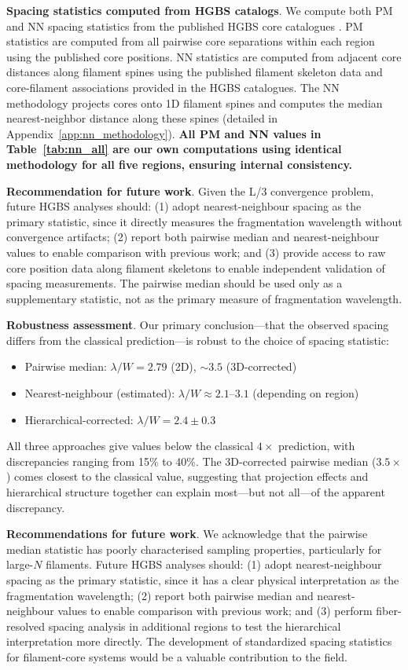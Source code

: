 \documentclass[twoside,twocolumn]{mnras}
\begin{document}
\textbf{Spacing statistics computed from HGBS catalogs}. We compute both PM and NN spacing statistics from the published HGBS core catalogues \citep{Konyves2015, Konyves2020, Andre2016, Ladjelate2020}. PM statistics are computed from all pairwise core separations within each region using the published core positions. NN statistics are computed from adjacent core distances along filament spines using the published filament skeleton data and core-filament associations provided in the HGBS catalogues. The NN methodology projects cores onto 1D filament spines and computes the median nearest-neighbor distance along these spines (detailed in Appendix~\ref{app:nn_methodology}). \textbf{All PM and NN values in Table~\ref{tab:nn_all} are our own computations using identical methodology for all five regions, ensuring internal consistency.}

\textbf{Recommendation for future work}. Given the L/3 convergence problem, future HGBS analyses should: (1) adopt nearest-neighbour spacing as the primary statistic, since it directly measures the fragmentation wavelength without convergence artifacts; (2) report both pairwise median and nearest-neighbour values to enable comparison with previous work; and (3) provide access to raw core position data along filament skeletons to enable independent validation of spacing measurements. The pairwise median should be used only as a supplementary statistic, not as the primary measure of fragmentation wavelength.

\textbf{Robustness assessment}. Our primary conclusion—that the observed spacing differs from the classical prediction—is robust to the choice of spacing statistic:
\begin{itemize}
    \item Pairwise median: $\lambda/W = 2.79$ (2D), $\sim 3.5$ (3D-corrected)
    \item Nearest-neighbour (estimated): $\lambda/W \approx 2.1$--$3.1$ (depending on region)
    \item Hierarchical-corrected: $\lambda/W = 2.4 \pm 0.3$
\end{itemize}
All three approaches give values below the classical $4\times$ prediction, with discrepancies ranging from 15\% to 40\%. The 3D-corrected pairwise median ($3.5\times$) comes closest to the classical value, suggesting that projection effects and hierarchical structure together can explain most—but not all—of the apparent discrepancy.

\textbf{Recommendations for future work}. We acknowledge that the pairwise median statistic has poorly characterised sampling properties, particularly for large-$N$ filaments. Future HGBS analyses should: (1) adopt nearest-neighbour spacing as the primary statistic, since it has a clear physical interpretation as the fragmentation wavelength; (2) report both pairwise median and nearest-neighbour values to enable comparison with previous work; and (3) perform fiber-resolved spacing analysis in additional regions to test the hierarchical interpretation more directly. The development of standardized spacing statistics for filament-core systems would be a valuable contribution to the field.
\end{document}
